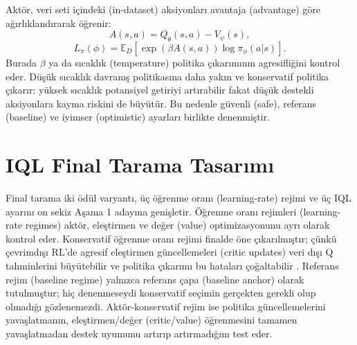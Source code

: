 \documentclass[conference]{IEEEtran}
\begin{document}
Aktör, veri seti içindeki (in-dataset) aksiyonları avantaja (advantage) göre ağırlıklandırarak öğrenir:
\begin{equation}
A(s,a)=Q_\theta(s,a)-V_\psi(s),
\end{equation}
\begin{equation}
L_\pi(\phi)=\mathbb{E}_{D}\left[\exp(\beta A(s,a))\log \pi_\phi(a|s)\right].
\end{equation}
Burada $\beta$ ya da sıcaklık (temperature) politika çıkarımının agresifliğini kontrol eder. Düşük sıcaklık davranış politikasına daha yakın ve konservatif politika çıkarır; yüksek sıcaklık potansiyel getiriyi artırabilir fakat düşük destekli aksiyonlara kayma riskini de büyütür. Bu nedenle güvenli (safe), referans (baseline) ve iyimser (optimistic) ayarları birlikte denenmiştir.

\section{IQL Final Tarama Tasarımı}
Final tarama iki ödül varyantı, üç öğrenme oranı (learning-rate) rejimi ve üç IQL ayarını on sekiz Aşama 1 adayına genişletir. Öğrenme oranı rejimleri (learning-rate regimes) aktör, eleştirmen ve değer (value) optimizasyonunu ayrı olarak kontrol eder. Konservatif öğrenme oranı rejimi finalde öne çıkarılmıştır; çünkü çevrimdışı RL'de agresif eleştirmen güncellemeleri (critic updates) veri dışı Q tahminlerini büyütebilir ve politika çıkarımı bu hataları çoğaltabilir \cite{cql,iql}. Referans rejim (baseline regime) yalnızca referans çapa (baseline anchor) olarak tutulmuştur; hiç denenmeseydi konservatif seçimin gerçekten gerekli olup olmadığı gözlenemezdi. Aktör-konservatif rejim ise politika güncellemelerini yavaşlatmanın, eleştirmen/değer (critic/value) öğrenmesini tamamen yavaşlatmadan destek uyumunu artırıp artırmadığını test eder.
\end{document}
